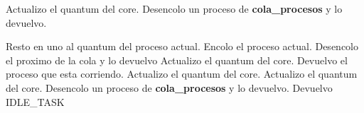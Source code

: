\begin{algorithmic}

		\State Actualizo el quantum del core.
		\State Desencolo un proceso de \textbf{cola\_procesos} y lo devuelvo.
			
		\State Resto en uno al quantum del proceso actual.
		\newline
			\State Encolo el proceso actual.
			\State Desencolo el proximo de la cola y lo devuelvo
			\State Actualizo el quantum del core.
			\State Devuelvo el proceso que esta corriendo.
			\State Actualizo el quantum del core.
		\EndIf
		\newline
		\State Actualizo el quantum del core.
		\State Desencolo un proceso de \textbf{cola\_procesos} y lo devuelvo.
	\Else
		\State Devuelvo IDLE\_TASK
	
	\EndIf
\EndFunction	
\end{algorithmic}
